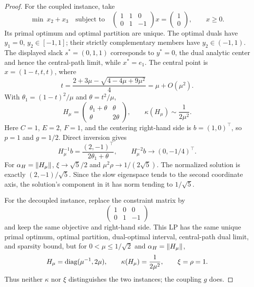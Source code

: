 \begin{proof}
For the coupled instance, take
\begin{equation}
 \min\ x_2+x_3
 \quad\text{subject to}\quad
 \begin{pmatrix}1&1&0\\0&1&-1\end{pmatrix}x
 =\begin{pmatrix}1\\0\end{pmatrix},\qquad x\ge0.
 \label{eq:coupled-small-lp}
\end{equation}
Its primal optimum and optimal partition are unique.  The optimal duals have
$y_1=0$, $y_2\in[-1,1]$; their strictly complementary members have
$y_2\in(-1,1)$.  The displayed slack
$s^*=(0,1,1)$ corresponds to $y^*=0$, the dual analytic center and hence the
central-path limit, while $x^*=e_1$.  The central point is
$x=(1-t,t,t)$, where
\[
 t=\frac{2+3\mu-\sqrt{4-4\mu+9\mu^2}}4=\mu+O(\mu^2).
\]
With $\theta_1=(1-t)^2/\mu$ and $\theta=t^2/\mu$,
\[
 H_\mu=
 \begin{pmatrix}\theta_1+\theta&\theta\\\theta&2\theta\end{pmatrix},
 \qquad \kappa(H_\mu)\sim\frac1{2\mu^2}.
\]
Here $C=1$, $E=2$, $F=1$, and the centering right-hand side is
$b=(1,0)^\top$, so $p=1$ and $g=1/2$.  Direct inversion gives
\[
 H_\mu^{-1}b=\frac{(2,-1)^\top}{2\theta_1+\theta},
 \qquad H_\mu^{-2}b\longrightarrow(0,-1/4)^\top.
\]
For $\alpha_H=\lVert H_\mu\rVert$,
$\xi\to\sqrt5/2$ and $\mu^2\rho\to1/(2\sqrt5)$.  The normalized solution
is exactly $(2,-1)/\sqrt5$. Since the slow eigenspace tends to the
second coordinate axis, the solution's component in it has norm tending
to $1/\sqrt5$.

For the decoupled instance, replace the constraint matrix by
\[
 \begin{pmatrix}1&0&0\\0&1&-1\end{pmatrix}
\]
and keep the same objective and right-hand side.  This LP has the same
unique primal optimum, optimal partition, dual-optimal interval,
central-path dual limit, and sparsity bound, but for $0<\mu\le1/\sqrt2$ and
$\alpha_H=\lVert H_\mu\rVert$,
\[
 H_\mu=\operatorname{diag}(\mu^{-1},2\mu),\qquad
 \kappa(H_\mu)=\frac1{2\mu^2},\qquad \xi=\rho=1.
\]
Thus neither $\kappa$ nor $\xi$ distinguishes the two instances; the
coupling $g$ does.
\end{proof}

